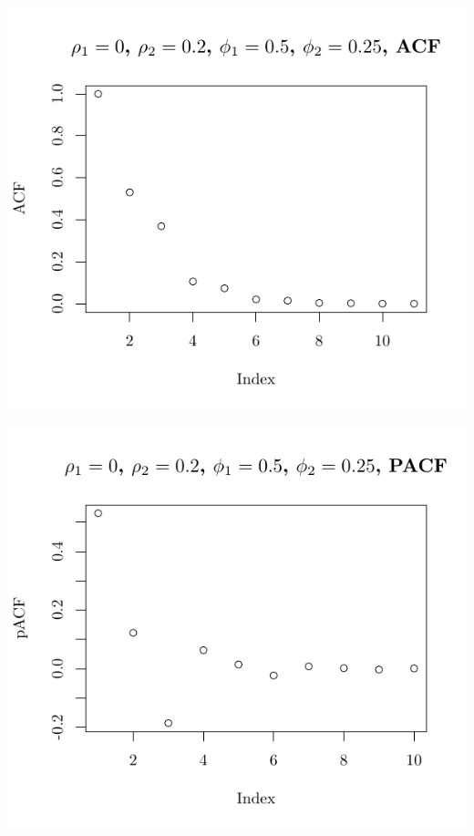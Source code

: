 \documentclass[10pt]{paper}\usepackage[]{graphicx}\usepackage[]{color}
\makeatletter
\def\maxwidth{ %
  \ifdim\Gin@nat@width>\linewidth
    \linewidth
  \else
    \Gin@nat@width
  \fi
}
\newenvironment{knitrout}{}{} %
\makeatother
\begin{document}
\begin{knitrout}
{\centering \includegraphics[width=\maxwidth]{figure/graphics-plotter-87} 

}




{\centering \includegraphics[width=\maxwidth]{figure/graphics-plotter-88} 

}





\end{knitrout}
\end{document}
